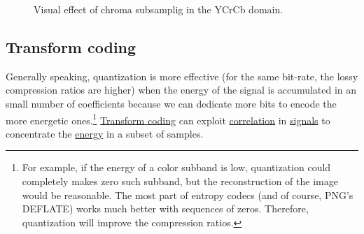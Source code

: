 \begin{figure}
  \centering
  \caption{Visual effect of chroma subsamplig in the YCrCb domain.}
  \label{fig:san-diego_chroma_subsampled}
\end{figure}

\subsection{Transform coding}
Generally speaking, quantization is more effective (for the same
bit-rate, the lossy compression ratios are higher) when the energy of
the signal is accumulated in an small number of coefficients because
we can dedicate more bits to encode the more energetic
ones.\footnote{For example, if the energy of a color subband is low,
quantization could completely makes zero such subband, but the
reconstruction of the image would be reasonable. The most part of
entropy codecs (and of course, PNG's DEFLATE) works much better with
sequences of zeros. Therefore, quantization will improve the
compression ratios.}
\href{https://web.stanford.edu/class/ee398a/handouts/lectures/07-TransformCoding.pdf}{Transform
  coding} can exploit
\href{https://en.wikipedia.org/wiki/Correlation_and_dependence}{correlation}
in \href{https://en.wikipedia.org/wiki/Signal}{signals} to concentrate
the
\href{https://en.wikipedia.org/wiki/Energy_(signal_processing)}{energy}
in a subset of samples.


